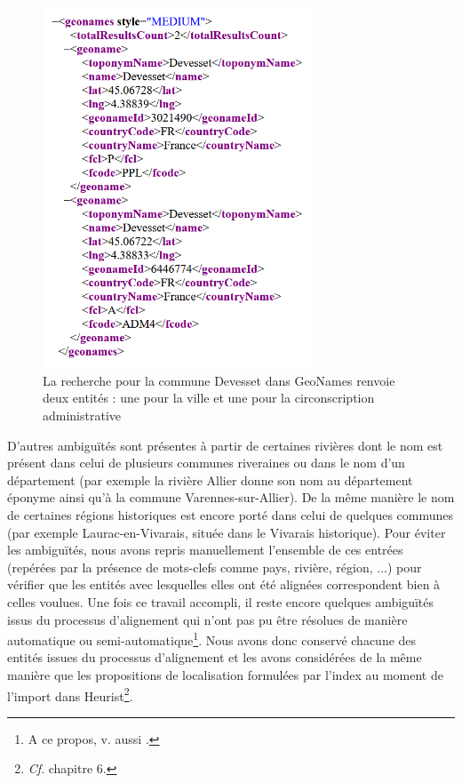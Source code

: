 \documentclass[a4paper,12pt,twoside]{book}
\begin{document}
	\begin{figure}
		\centering
		\includegraphics[width=8cm]{Images/town_on_geonames.png}
		\caption{La recherche pour la commune \og Devesset\fg{} dans GeoNames renvoie deux entités : une pour la ville et une pour la circonscription administrative}
		\label{Double_retour_GeoNames}
	\end{figure}
	
	 D'autres ambiguïtés sont présentes à partir de certaines rivières dont le nom est présent dans celui de plusieurs communes riveraines ou dans le nom d'un département (par exemple la rivière Allier donne son nom au département éponyme ainsi qu'à la commune Varennes-sur-Allier). De la même manière le nom de certaines régions historiques est encore porté dans celui de quelques communes (par exemple Laurac-en-Vivarais, située dans le Vivarais historique). Pour éviter les ambiguïtés, nous avons repris manuellement l'ensemble de ces entrées (repérées par la présence de mots-clefs comme \og pays\fg{}, \og rivière\fg{}, \og région\fg{}, ...) pour vérifier que les entités avec lesquelles elles ont été alignées correspondent bien à celles voulues. Une fois ce travail accompli, il reste encore quelques ambiguïtés issus du processus d'alignement qui n'ont pas pu être résolues de manière automatique ou semi-automatique\footnote{A ce propos, v. aussi \cite{reignier_lindex_2022}.}. Nous avons donc conservé chacune des entités issues du processus d'alignement et les avons considérées de la même manière que les propositions de localisation formulées par l'index au moment de l'import dans Heurist\footnote{\textit{Cf}. chapitre 6.}.
	
\end{document}
